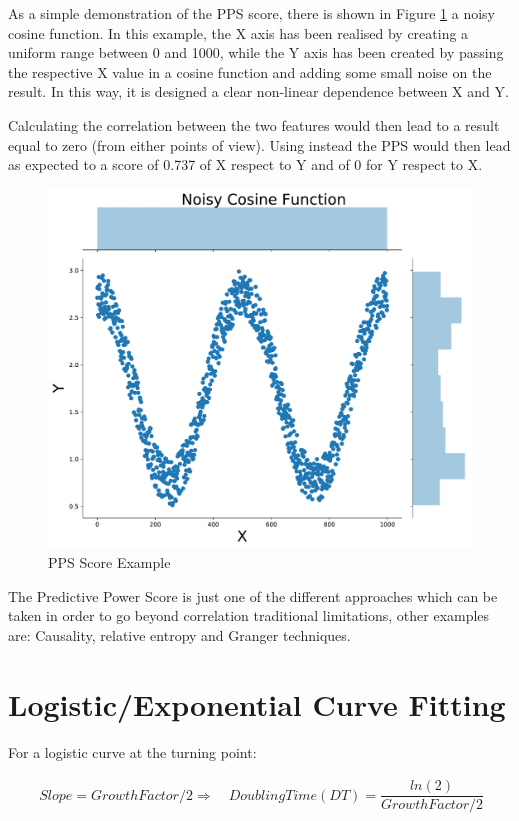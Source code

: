 \begin{appendices}
As a simple demonstration of the PPS score, there is shown in Figure \ref{pps_ex} a noisy cosine function. In this example, the X axis has been realised by creating a uniform range between 0 and 1000, while the Y axis has been created by passing the respective X value in a cosine function and adding some small noise on the result. In this way, it is designed a clear non-linear dependence between X and Y. 

Calculating the correlation between the two features would then lead to a result equal to zero (from either points of view). Using instead the PPS would then lead as expected to a score of 0.737 of X respect to Y and of 0 for Y respect to X. 

\begin{figure}[ht!]%
    \centering
    \includegraphics[width=0.45\linewidth]{latex/images/pps_ex.pdf}
    \vspace{-0.2cm}
    \caption{PPS Score Example}
    \label{pps_ex}
\end{figure}

The Predictive Power Score is just one of the different approaches which can be taken in order to go beyond correlation traditional limitations, other examples are: Causality, relative entropy and Granger techniques.

\clearpage

\section{Logistic/Exponential Curve Fitting}
\label{exp_fit}

For a logistic curve at the turning point: 

\useshortskip
\begin{align}
\ Slope = Growth Factor/2 \Rightarrow\quad Doubling Time (DT) = \dfrac{ln(2)}{Growth Factor/2}
\end{align}
\useshortskip


\end{appendices}
